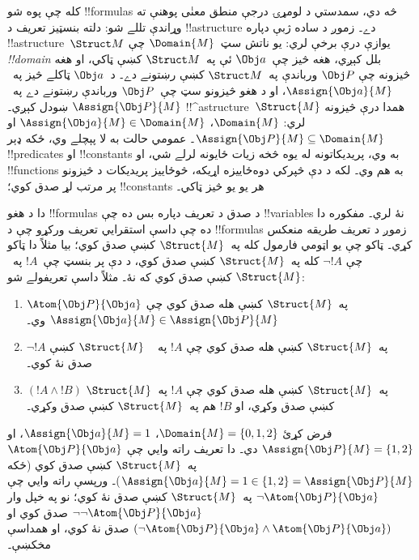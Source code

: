 \documentclass[../../../include/open-logic-section]{subfiles}
\begin{document}


کله چې پوه شو !!{formula}s څه دي، سمدستي د لومړۍ درجې منطق معنٰی
پوهنې ته وړاندې تللے شو: دلته بنسټيز تعريف د !!a{structure} دے۔
زموږ د ساده ژبې دپاره !!a{structure}~$\Struct M$ يوازې درې برخې
لري: يو ناتش سټ~$\Domain{M}$ چې \emph{!!{domain}} بلل کېږي، هغه
څيز چې~$\Obj a$ ئې په~$\Struct M$ کښې ټاکي، او هغه څيزونه چې
$\Obj P$ ورباندې په~$\Struct M$ کښې رښتونے دے۔ د~$\Obj a$ ټاکلے
څيز په~$\Assign{\Obj a}{M}$، او د هغو څيزونو سټ چې~$\Obj P$
ورباندې رښتونے دے په~$\Assign{\Obj P}{M}$ ښودل کېږي۔
!!^a{structure}~$\Struct{M}$ همدا درې څيزونه لري: $\Domain{M}$،
$\Assign{\Obj a}{M} \in \Domain{M}$ او
$\Assign{\Obj P}{M} \subseteq \Domain{M}$۔ عمومي حالت به لا پېچلے
وي، ځکه ډېر !!{predicate}s او !!{constant}s به وي،
پريديکاتونه له يوه څخه زيات ځايونه لرلے شي، او !!{function}s به
هم وي۔ لکه د دې څپرکي دوه‌ځاييزه اړيکه، څوځاييز پريديکات
د څيزونو پر مرتب لړ صدق کوي؛ !!{constant}s هر يو يو څيز ټاکي۔

دا د هغو !!{formula}s د صدق د تعريف دپاره بس ده چې !!{variable}s
نۀ لري۔ مفکوره دا ده چې داسې استقرايي تعريف ورکړو چې د
!!{formula}s زموږ د تعريف طريقه منعکس کړي۔ ټاکو چې يو اټومي فارمول
کله په~$\Struct{M}$ کښې صدق کوي؛ بيا مثلاً دا ټاکو چې $\lnot !A$
کله په~$\Struct{M}$ کښې صدق کوي، د دې پر بنسټ چې~$!A$ په~$\Struct{M}$ کښې صدق
کوي که نۀ۔ مثلاً داسې تعريفولے شو:
\begin{enumerate}
  \item $\Atom{\Obj P}{\Obj a}$ په~$\Struct{M}$ کښې هله صدق کوي
  چې $\Assign{\Obj a}{M} \in \Assign{\Obj P}{M}$ وي۔
  \item $\lnot !A$ په~$\Struct{M}$ کښې هله صدق کوي چې $!A$ په
  ~ $\Struct{M}$ کښې صدق نۀ کوي۔
  \item $(!A \land !B)$ په~$\Struct{M}$ کښې هله صدق کوي چې $!A$
  په~$\Struct{M}$ کښې صدق وکړي، او $!B$ هم په~$\Struct{M}$ کښې
  صدق وکړي۔
\end{enumerate}
فرض کړئ $\Domain{M} = \{0, 1, 2\}$، $\Assign{\Obj a}{M} = 1$، او
$\Assign{\Obj P}{M} = \{1, 2\}$ دي۔ دا تعريف راته وايي چې
$\Atom{\Obj P}{\Obj a}$ په~$\Struct{M}$ کښې صدق کوي (ځکه
$\Assign{\Obj a}{M} =  1 \in \{1,2\} = \Assign{\Obj P}{M}$)۔
ورپسې راته وايي چې $\lnot \Atom{\Obj P}{\Obj a}$ په~$\Struct{M}$
کښې صدق نۀ کوي؛ نو په خپل وار $\lnot\lnot \Atom{\Obj P}{\Obj a}$
صدق کوي او $(\lnot \Atom{\Obj P}{\Obj a} \land \Atom{\Obj P}{\Obj a})$
صدق نۀ کوي، او همداسې مخکښې۔
\end{document}
